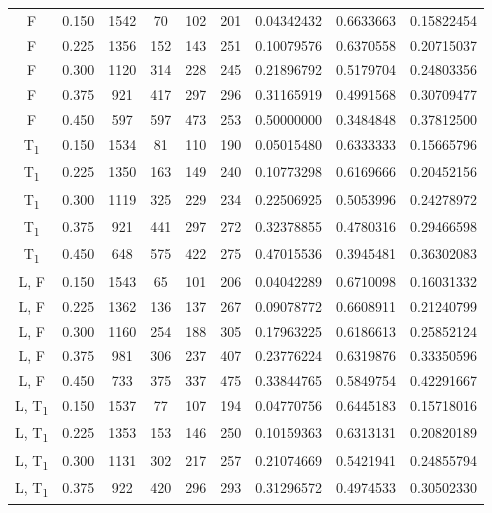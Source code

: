 {\begin{landscape}
\begin{tabular}{ccccccccc}
            F & 0.150 & 1542 & 70 & 102 & 201 & 0.04342432 & 0.6633663 & 0.15822454 \\
            F & 0.225 & 1356 & 152 & 143 & 251 & 0.10079576 & 0.6370558 & 0.20715037 \\
            F & 0.300 & 1120 & 314 & 228 & 245 & 0.21896792 & 0.5179704 & 0.24803356 \\
            F & 0.375 & 921 & 417 & 297 & 296 & 0.31165919 & 0.4991568 & 0.30709477 \\
            F & 0.450 & 597 & 597 & 473 & 253 & 0.50000000 & 0.3484848 & 0.37812500 \\
            T\textsubscript{1} & 0.150 & 1534 & 81 & 110 & 190 & 0.05015480 & 0.6333333 & 0.15665796 \\
            T\textsubscript{1} & 0.225 & 1350 & 163 & 149 & 240 & 0.10773298 & 0.6169666 & 0.20452156 \\
            T\textsubscript{1} & 0.300 & 1119 & 325 & 229 & 234 & 0.22506925 & 0.5053996 & 0.24278972 \\
            T\textsubscript{1} & 0.375 & 921 & 441 & 297 & 272 & 0.32378855 & 0.4780316 & 0.29466598 \\
            T\textsubscript{1} & 0.450 & 648 & 575 & 422 & 275 & 0.47015536 & 0.3945481 & 0.36302083 \\
            L, F & 0.150 & 1543 & 65 & 101 & 206 & 0.04042289 & 0.6710098 & 0.16031332 \\
            L, F & 0.225 & 1362 & 136 & 137 & 267 & 0.09078772 & 0.6608911 & 0.21240799 \\
            L, F & 0.300 & 1160 & 254 & 188 & 305 & 0.17963225 & 0.6186613 & 0.25852124 \\
            L, F & 0.375 & 981 & 306 & 237 & 407 & 0.23776224 & 0.6319876 & 0.33350596 \\
            L, F & 0.450 & 733 & 375 & 337 & 475 & 0.33844765 & 0.5849754 & 0.42291667 \\
            L, T\textsubscript{1} & 0.150 & 1537 & 77 & 107 & 194 & 0.04770756 & 0.6445183 & 0.15718016 \\
            L, T\textsubscript{1} & 0.225 & 1353 & 153 & 146 & 250 & 0.10159363 & 0.6313131 & 0.20820189 \\
            L, T\textsubscript{1} & 0.300 & 1131 & 302 & 217 & 257 & 0.21074669 & 0.5421941 & 0.24855794 \\
            L, T\textsubscript{1} & 0.375 & 922 & 420 & 296 & 293 & 0.31296572 & 0.4974533 & 0.30502330 \\

\end{tabular}
\end{landscape}}
